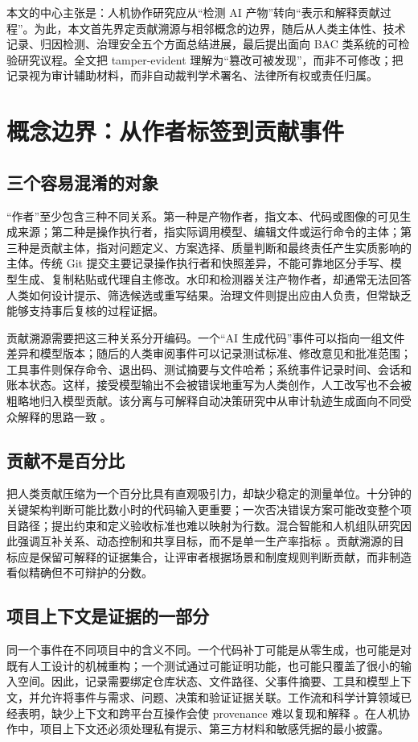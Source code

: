 \documentclass[UTF8,a4paper,12pt]{ctexart}
\begin{document}
本文的中心主张是：人机协作研究应从“检测 AI 产物”转向“表示和解释贡献过程”。为此，本文首先界定贡献溯源与相邻概念的边界，随后从人类主体性、技术记录、归因检测、治理安全五个方面总结进展，最后提出面向 BAC 类系统的可检验研究议程。全文把 tamper-evident 理解为“篡改可被发现”，而非不可修改；把记录视为审计辅助材料，而非自动裁判学术署名、法律所有权或责任归属。

\section{概念边界：从作者标签到贡献事件}
\subsection{三个容易混淆的对象}
“作者”至少包含三种不同关系。第一种是产物作者，指文本、代码或图像的可见生成来源；第二种是操作执行者，指实际调用模型、编辑文件或运行命令的主体；第三种是贡献主体，指对问题定义、方案选择、质量判断和最终责任产生实质影响的主体。传统 Git 提交主要记录操作执行者和快照差异，不能可靠地区分手写、模型生成、复制粘贴或代理自主修改。水印和检测器关注产物作者，却通常无法回答人类如何设计提示、筛选候选或重写结果。治理文件则提出应由人负责，但常缺乏能够支持事后复核的过程证据。

贡献溯源需要把这三种关系分开编码。一个“AI 生成代码”事件可以指向一组文件差异和模型版本；随后的人类审阅事件可以记录测试标准、修改意见和批准范围；工具事件则保存命令、退出码、测试摘要与文件哈希；系统事件记录时间、会话和账本状态。这样，接受模型输出不会被错误地重写为人类创作，人工改写也不会被粗略地归入模型贡献。该分离与可解释自动决策研究中从审计轨迹生成面向不同受众解释的思路一致 \cite{addressingregulatoryrequirements2020,decisionprovenanceharnessing2018}。

\subsection{贡献不是百分比}
把人类贡献压缩为一个百分比具有直观吸引力，却缺少稳定的测量单位。十分钟的关键架构判断可能比数小时的代码输入更重要；一次否决错误方案可能改变整个项目路径；提出约束和定义验收标准也难以映射为行数。混合智能和人机组队研究因此强调互补关系、动态控制和共享目标，而不是单一生产率指标 \cite{towardascience2026,hybridintelligencehuman2025,prioritizinghumanai2026}。贡献溯源的目标应是保留可解释的证据集合，让评审者根据场景和制度规则判断贡献，而非制造看似精确但不可辩护的分数。

\subsection{项目上下文是证据的一部分}
同一个事件在不同项目中的含义不同。一个代码补丁可能是从零生成，也可能是对既有人工设计的机械重构；一个测试通过可能证明功能，也可能只覆盖了很小的输入空间。因此，记录需要绑定仓库状态、文件路径、父事件摘要、工具和模型上下文，并允许将事件与需求、问题、决策和验证证据关联。工作流和科学计算领域已经表明，缺少上下文和跨平台互操作会使 provenance 难以复现和解释 \cite{sharinginteroperableworkflow2018,sharinginteroperableworkflow2019,recordingprovenanceof2024}。在人机协作中，项目上下文还必须处理私有提示、第三方材料和敏感凭据的最小披露。
\end{document}
